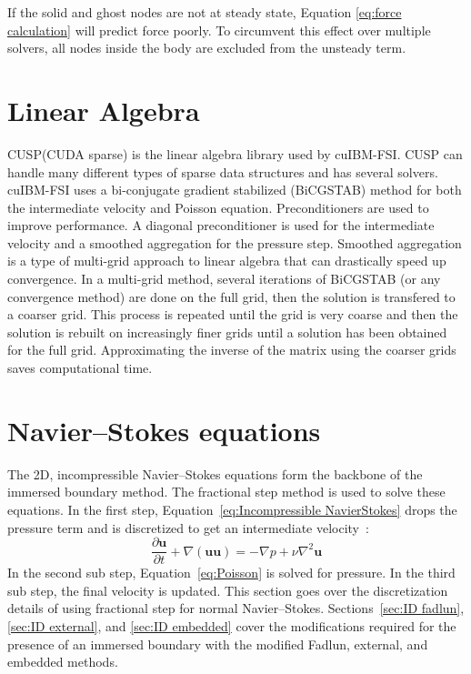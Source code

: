 If the solid and ghost nodes are not at steady state, Equation \eqref{eq:force calculation} will predict force poorly. 
To circumvent this effect over multiple solvers, all nodes inside the body are excluded from the unsteady term. 

\section{Linear Algebra}
\label{Preconditioning and Linear Algebra Solvers}
CUSP(CUDA sparse) is the linear algebra library used by cuIBM-FSI. 
CUSP can handle many different types of sparse data structures and has several solvers. 
cuIBM-FSI uses a bi-conjugate gradient stabilized (BiCGSTAB) method for both the intermediate velocity and Poisson equation. 
Preconditioners are used to improve performance. 
A diagonal preconditioner is used for the intermediate velocity and a smoothed aggregation for the pressure step. 
Smoothed aggregation is a type of multi-grid approach to linear algebra that can drastically speed up convergence. 
In a multi-grid method, several iterations of BiCGSTAB (or any convergence method) are done on the full grid, then the solution is transfered to a coarser grid. 
This process is repeated until the grid is very coarse and then the solution is rebuilt on increasingly finer grids until a solution has been obtained for the full grid. 
Approximating the inverse of the matrix using the coarser grids saves computational time. 
\section{Navier--Stokes equations}
\label{ID:Navier Stokes}

The 2D, incompressible Navier--Stokes equations form the backbone of the immersed boundary method. 
The fractional step method is used to solve these equations. 
In the first step, Equation~\eqref{eq:Incompressible NavierStokes} drops the pressure term and is discretized to get an intermediate velocity~\cite{Perot1993}: 
\begin{equation}
\frac{\partial \textbf{u}}{\partial t} + \nabla ( \textbf{uu} ) = -\nabla p + \nu\nabla^{2}\textbf{u} \label{eq:Incompressible NavierStokes}
\end{equation}
In the second sub step, Equation~\eqref{eq:Poisson} is solved for pressure. 
In the third sub step, the final velocity is updated. 
This section goes over the discretization details of using fractional step for normal Navier--Stokes. 
Sections~\ref{sec:ID fadlun}, \ref{sec:ID external}, and \ref{sec:ID embedded} cover the modifications required for the presence of an immersed boundary with the modified Fadlun, external, and embedded methods. 

